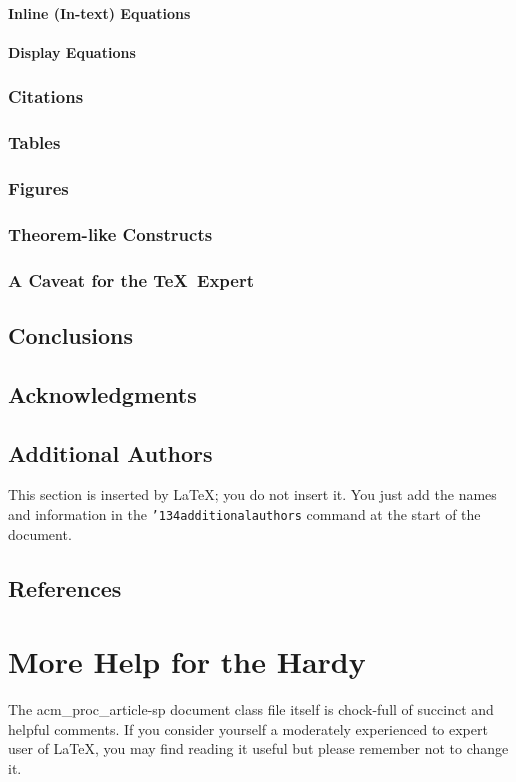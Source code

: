 \documentclass{acm_proc_article-sp}
\begin{document}
\paragraph{Inline (In-text) Equations}
\paragraph{Display Equations}
\subsubsection{Citations}
\subsubsection{Tables}
\subsubsection{Figures}
\subsubsection{Theorem-like Constructs}
\subsubsection*{A Caveat for the \TeX\ Expert}
\subsection{Conclusions}
\subsection{Acknowledgments}
\subsection{Additional Authors}
This section is inserted by \LaTeX; you do not insert it.
You just add the names and information in the
\texttt{{\char'134}additionalauthors} command at the start
of the document.
\subsection{References}
\section{More Help for the Hardy}
The acm\_proc\_article-sp document class file itself is chock-full of succinct
and helpful comments.  If you consider yourself a moderately
experienced to expert user of \LaTeX, you may find reading
it useful but please remember not to change it.
\balancecolumns
\end{document}
